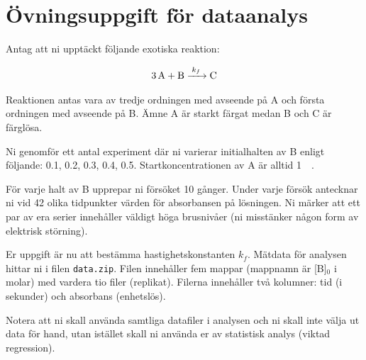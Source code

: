 \section{Övningsuppgift för dataanalys}
\label{sec:exercise}
Antag att ni upptäckt följande exotiska reaktion:

\begin{align}
  \label{eq:fourth-order}
  \ce{3A + B ->[k_f] C}
\end{align}

Reaktionen antas vara av tredje ordningen med avseende på A och första
ordningen med avseende på B. Ämne A är starkt färgat medan B och C är
färglösa.

Ni genomför ett antal experiment där ni varierar initialhalten av B enligt
följande: \SI{0.1}{\Molar}, \SI{0.2}{\Molar}, \SI{0.3}{\Molar}, \SI{0.4}{\Molar},
\SI{0.5}{\Molar}. Startkoncentrationen av A är alltid \SI{1}{\milli\Molar}.

För varje halt av B upprepar ni försöket 10 gånger. Under varje försök
antecknar ni vid 42 olika tidpunkter värden för absorbansen på lösningen.
Ni märker att ett par av era serier innehåller väldigt höga brusnivåer
(ni misstänker någon form av elektrisk störning).

Er uppgift är nu att bestämma hastighetskonstanten $k_f$. Mätdata för
analysen hittar ni i filen {\tt data.zip}. Filen innehåller fem mappar
(mappnamn är [B]$_0$ i molar) med vardera tio filer (replikat). Filerna
innehåller två kolumner: tid (i sekunder) och absorbans (enhetslös).

Notera att ni skall använda samtliga datafiler i analysen och ni skall
inte välja ut data för hand, utan istället skall ni använda er av
statistisk analys (viktad regression).

